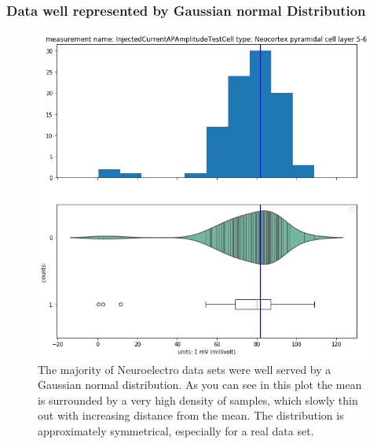 \subsubsection{Data well represented by Gaussian normal Distribution}    

\begin{figure} 
    \begin{center}
   \includegraphics[scale=0.8]{figures/mean_well_served.png}
   \caption[AP Threshold Data Distribution, Layer 5 Pyramidal Cell]{The majority of Neuroelectro data sets were well served by a Gaussian normal distribution. As you can see in this plot the mean is surrounded by a very high density of samples, which slowly thin out with increasing distance from the mean. The distribution is approximately symmetrical, especially for a real data set.}
    \end{center}
\end{figure}   

